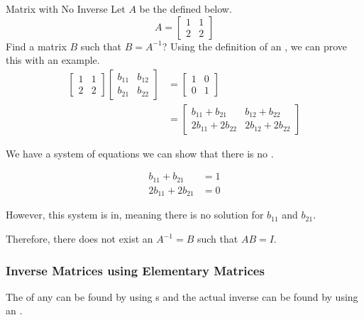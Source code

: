 \begin{example}{Matrix with No Inverse}
  Let $A$ be the  defined below.
  \begin{equation*}
    A =
    \begin{bmatrix}
      1 & 1 \\
      2 & 2
    \end{bmatrix}
  \end{equation*}
  Find a matrix $B$ such that $B = A^{-1}$?
  \tcblower{}
  Using the definition of an , we can prove this with an example.
  \begin{align*}
    \begin{bmatrix}
      1 & 1 \\
      2 & 2
    \end{bmatrix}
          \begin{bmatrix}
            b_{11} & b_{12} \\
            b_{21} & b_{22}
          \end{bmatrix}
        &=
          \begin{bmatrix}
            1 & 0 \\
            0 & 1
          \end{bmatrix} \\
    &=
      \begin{bmatrix}
        b_{11} + b_{21} & b_{12} + b_{22} \\
        2b_{11} + 2b_{22} & 2b_{12} + 2b_{22}
      \end{bmatrix}
  \end{align*}

  We have a system of equations we can show that there is no .

  \begin{align*}
    b_{11} + b_{21} &= 1 \\
    2b_{11} + 2b_{21} &= 0
  \end{align*}

  However, this system is in, meaning there is no solution for $b_{11}$ and $b_{21}$.

  Therefore, there does not exist an $A^{-1} = B$ such that $AB = I$.
\end{example}

\subsubsection{Inverse Matrices using Elementary Matrices}\label{subsubsec:Inverse_Matrices_using_Elementary_Matrices}
The  of any  can be found by using s and the actual inverse can be found by using an .

